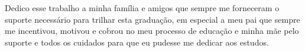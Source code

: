 Dedico esse trabalho a minha família e amigos que sempre me forneceram o suporte necessário para trilhar esta graduação, em especial a meu pai que sempre me incentivou, motivou e cobrou no meu processo de educação e minha mãe pelo suporte e todos os cuidados para que eu pudesse me dedicar aos estudos.

